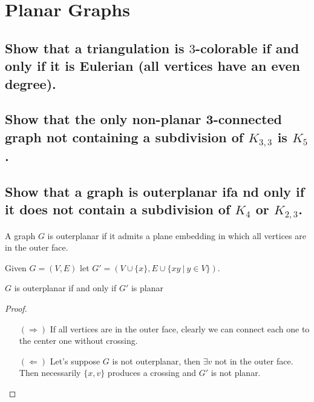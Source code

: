 \section{Planar Graphs}

\subsection[Planar Graphs 2]{Show that a triangulation is $3$-colorable if and only if it is Eulerian (all vertices have an even degree).}

\subsection[Planar Graphs 10]{Show that the only non-planar 3-connected graph not containing a subdivision of $K_{3,3}$ is $K_5$.}

\subsection[Planar Graphs 11]{Show that a graph is outerplanar ifa nd only if it does not contain a subdivision of $K_4$ or $K_{2,3}$.}

\begin{definition}
    A graph $G$ is outerplanar if it admits a plane embedding in which all vertices are in the outer face.
\end{definition}

Given $G = (V, E)$ let $G' = (V \cup \{ x\}, E \cup \{ xy \: | \: y \in V \})$.

\begin{claim}
    $G$ is outerplanar if and only if $G'$ is planar
\end{claim}
\begin{proof}
    \begin{itemize}
        \item[$(\Rightarrow)$] If all vertices are in the outer face, clearly we can connect each one to the center one without crossing.
        \item[$(\Leftarrow)$] Let's suppose $G$ is not outerplanar, then $\exists v$ not in the outer face.
            Then necessarily $\{x , v\}$ produces a crossing and $G'$ is not planar.
    \end{itemize}
\end{proof}

